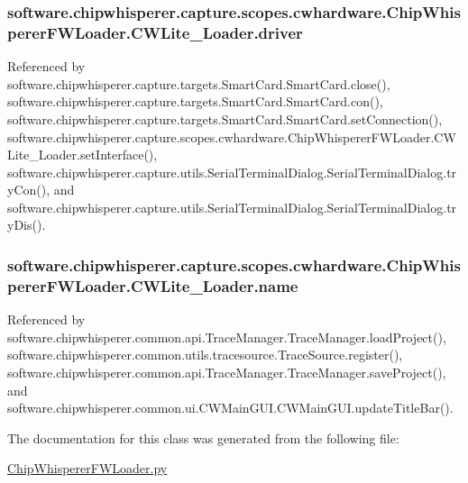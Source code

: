 \subsubsection[{driver}]{\setlength{\rightskip}{0pt plus 5cm}software.\+chipwhisperer.\+capture.\+scopes.\+cwhardware.\+Chip\+Whisperer\+F\+W\+Loader.\+C\+W\+Lite\+\_\+\+Loader.\+driver}\label{classsoftware_1_1chipwhisperer_1_1capture_1_1scopes_1_1cwhardware_1_1ChipWhispererFWLoader_1_1CWLite__Loader_abc68568b29fd9e39242f6a04f804cdcc}


Referenced by software.\+chipwhisperer.\+capture.\+targets.\+Smart\+Card.\+Smart\+Card.\+close(), software.\+chipwhisperer.\+capture.\+targets.\+Smart\+Card.\+Smart\+Card.\+con(), software.\+chipwhisperer.\+capture.\+targets.\+Smart\+Card.\+Smart\+Card.\+set\+Connection(), software.\+chipwhisperer.\+capture.\+scopes.\+cwhardware.\+Chip\+Whisperer\+F\+W\+Loader.\+C\+W\+Lite\+\_\+\+Loader.\+set\+Interface(), software.\+chipwhisperer.\+capture.\+utils.\+Serial\+Terminal\+Dialog.\+Serial\+Terminal\+Dialog.\+try\+Con(), and software.\+chipwhisperer.\+capture.\+utils.\+Serial\+Terminal\+Dialog.\+Serial\+Terminal\+Dialog.\+try\+Dis().

\hypertarget{classsoftware_1_1chipwhisperer_1_1capture_1_1scopes_1_1cwhardware_1_1ChipWhispererFWLoader_1_1CWLite__Loader_a1e8d274fe0bb5445ee81c428d6b4905f}{}
\subsubsection[{name}]{\setlength{\rightskip}{0pt plus 5cm}software.\+chipwhisperer.\+capture.\+scopes.\+cwhardware.\+Chip\+Whisperer\+F\+W\+Loader.\+C\+W\+Lite\+\_\+\+Loader.\+name}\label{classsoftware_1_1chipwhisperer_1_1capture_1_1scopes_1_1cwhardware_1_1ChipWhispererFWLoader_1_1CWLite__Loader_a1e8d274fe0bb5445ee81c428d6b4905f}


Referenced by software.\+chipwhisperer.\+common.\+api.\+Trace\+Manager.\+Trace\+Manager.\+load\+Project(), software.\+chipwhisperer.\+common.\+utils.\+tracesource.\+Trace\+Source.\+register(), software.\+chipwhisperer.\+common.\+api.\+Trace\+Manager.\+Trace\+Manager.\+save\+Project(), and software.\+chipwhisperer.\+common.\+ui.\+C\+W\+Main\+G\+U\+I.\+C\+W\+Main\+G\+U\+I.\+update\+Title\+Bar().



The documentation for this class was generated from the following file\+:\begin{DoxyCompactItemize}
\item 
\hyperlink{ChipWhispererFWLoader_8py}{Chip\+Whisperer\+F\+W\+Loader.\+py}\end{DoxyCompactItemize}
